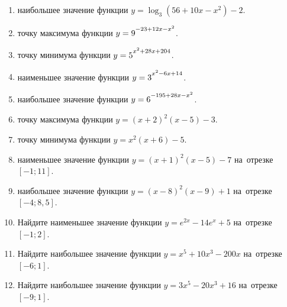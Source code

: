 \documentclass[a4paper,10pt]{article}
\begin{document}
\begin{enumerate}
\item {} наибольшее значение функции $y=\log_3\left(56+10x-x^2\right)-2$.

\item {} точку максимума функции $y=9\strut^{-23+12x-x^2}$.

\item {} точку минимума функции $y=5\strut^{x^2+28x+204}$.

\item {} наименьшее значение функции $y=3\strut^{x^2-6x+14}$.

\item {} наибольшее значение функции $y=6\strut^{-195+28x-x^2}$.

\item {} точку максимума функции $y=\left(x+2\right)^2\left(x-5\right)-3$.

\item {} точку минимума функции $y=x^2\left(x+6\right)-5$.

\item {} наименьшее значение функции $y=\left(x+1\right)^2\left(x-5\right)-7$ на~отрезке~$\left[-1;11\right]$.

\item {} наибольшее значение функции $y=\left(x-8\right)^2\left(x-9\right)+1$ на~отрезке~$\left[-4;8{,}5\right]$.

\item Найдите наименьшее значение функции $y=e^{2x}-14e^x+5$ на~отрезке~$\left[-1;2\right]$.

\item Найдите наибольшее значение функции $y=x^5+10x^3-200x$ на~отрезке~$\left[-6;1\right]$.

\item Найдите наибольшее значение функции $y=3x^5-20x^3+16$ на~отрезке~$\left[-9;1\right]$.

\end{enumerate}
\end{document}

